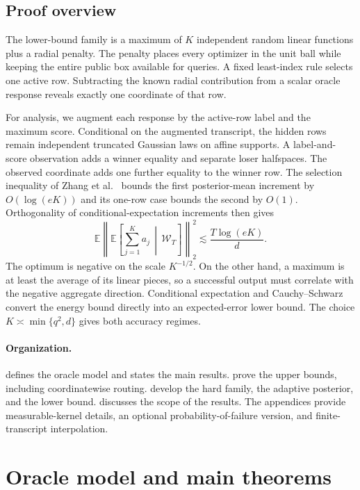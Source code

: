 \documentclass[11pt]{article}
\numberwithin{equation}{section}
\theoremstyle{definition}
\theoremstyle{remark}
\newcommand{\E}{\mathbb E}
\newcommand{\cW}{\mathcal W}
\begin{document}
\subsection{Proof overview}

The lower-bound family is a maximum of $K$ independent random linear functions plus a radial penalty. The penalty places every optimizer in the unit ball while keeping the entire public box available for queries. A fixed least-index rule selects one active row. Subtracting the known radial contribution from a scalar oracle response reveals exactly one coordinate of that row.

For analysis, we augment each response by the active-row label and the maximum score. Conditional on the augmented transcript, the hidden rows remain independent truncated Gaussian laws on affine supports. A label-and-score observation adds a winner equality and separate loser halfspaces. The observed coordinate adds one further equality to the winner row. The selection inequality of Zhang et al.\ \cite[Theorem~14]{ZZQL2026} bounds the first posterior-mean increment by $O(\log(eK))$ and its one-row case bounds the second by $O(1)$. Orthogonality of conditional-expectation increments then gives
\[
\E\left\|\E\left[\sum_{j=1}^K a_j\,\middle|\,\cW_T\right]\right\|_2^2
\lesssim \frac{T\log(eK)}d.
\]
The optimum is negative on the scale $K^{-1/2}$. On the other hand, a maximum is at least the average of its linear pieces, so a successful output must correlate with the negative aggregate direction. Conditional expectation and Cauchy--Schwarz convert the energy bound directly into an expected-error lower bound. The choice $K\asymp\min\{q^2,d\}$ gives both accuracy regimes.

\paragraph{Organization.}
 defines the oracle model and states the main results.  prove the upper bounds, including coordinatewise routing.  develop the hard family, the adaptive posterior, and the lower bound.  discusses the scope of the results. The appendices provide measurable-kernel details, an optional probability-of-failure version, and finite-transcript interpolation.

\section{Oracle model and main theorems}\label{sec:model}
\end{document}
